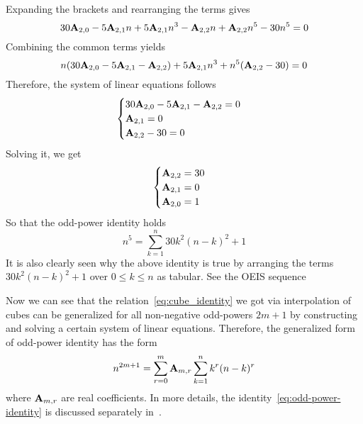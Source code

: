 Expanding the brackets and rearranging the terms gives
\begin{equation*}
    30 {\mathbf{A}} \sb{2,0} - 5 {\mathbf{A}} \sb{2,1} n + 5 {\mathbf{A}} \sb{2,1} n^3 - {\mathbf{A}} \sb{2,2} n + {\mathbf{A}} \sb{2,2} n^5 - 30n^5 = 0
\end{equation*}
Combining the common terms yields
\begin{equation*}
    n (30 {\mathbf{A}} \sb{2,0} - 5 {\mathbf{A}} \sb{2,1} - {\mathbf{A}} \sb{2,2}) + 5 {\mathbf{A}} \sb{2,1} n^3 + n^5 ({\mathbf{A}} \sb{2,2} - 30) = 0
\end{equation*}
Therefore, the system of linear equations follows
\begin{equation*}
    \begin{cases}
        30 {\mathbf{A}} \sb{2,0} - 5 {\mathbf{A}} \sb{2,1} - {\mathbf{A}} \sb{2,2} = 0 \\
        {\mathbf{A}} \sb{2,1} = 0 \\
        {\mathbf{A}} \sb{2,2} - 30 = 0
    \end{cases}
\end{equation*}
Solving it, we get
\begin{equation*}
    \begin{cases}
        {\mathbf{A}} \sb{2,2} = 30 \\
        {\mathbf{A}} \sb{2,1} = 0 \\
        {\mathbf{A}} \sb{2,0} = 1
    \end{cases}
\end{equation*}
So that the odd-power identity holds
\begin{equation*}
    n^5 = \sum_{k=1}^{n} 30k^2(n-k)^2 + 1
\end{equation*}
It is also clearly seen
why the above identity is true by arranging the terms $30k^2(n-k)^2 + 1$ over $0 \leq k \leq n$ as tabular.
See the OEIS sequence~\cite{oeis_numerical_triangle_row_sums_give_fifth_powers}


Now we can see that the relation~\eqref{eq:cube_identity}
we got via interpolation of cubes
can be generalized for all non-negative odd-powers $2m+1$ by constructing
and solving a certain system of linear equations.
Therefore, the generalized form of odd-power identity has the form
\begin{equation}
    n^{2m+1} = \sum_{r=0}^{m} {\mathbf{A}} \sb{m,r} \sum_{k=1}^{n} k^{r} (n-k)^{r}\label{eq:odd-power-identity}
\end{equation}
where ${\mathbf{A}} \sb{m,r}$ are real coefficients.
In more details, the identity~\eqref{eq:odd-power-identity} is discussed
separately in~\cite{unusual_identity_for_odd_powers, polynomial_identity_with_binomial_theorem_and_faulhabers_formula}.

